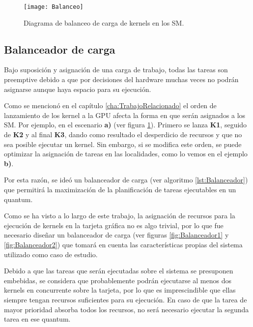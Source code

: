 

        \begin{figure}[!h]
      \centering
        \texttt{[image: Balanceo]}
        \caption{Diagrama de balanceo de carga de kernels en los SM.}
        \label{fig:Balanceo}
    \end{figure}
    

\subsection{Balanceador de carga} \label{secc:balanceador}

Bajo suposición y asignación de una carga de trabajo, todas las tareas son preemptive debido a que por decisiones del hardware muchas veces no podrán asignarse aunque haya espacio para su ejecución.

Como se mencionó en el capítulo \ref{cha:TrabajoRelacionado} el orden de lanzamiento de los kernel a la GPU afecta la forma en que serán asignados a los SM. Por ejemplo, en el escenario \textbf{a)} (ver figura \ref{fig:Balanceo}). Primero se lanza \textbf{K1}, seguido de \textbf{K2} y al final \textbf{K3}, dando como resultado el desperdicio de recursos y que no sea posible ejecutar un kernel. Sin embargo, si se modifica este orden, se puede optimizar la asignación de tareas en las localidades, como lo vemos en el ejemplo \textbf{b)}.

Por esta razón, se ideó un balanceador de carga (ver algoritmo \ref{lst:Balanceador}) que permitirá la maximización de la planificación de tareas ejecutables en un quantum.
\newline

    Como se ha visto a lo largo de este trabajo, la asignación de recursos para la ejecución de kernels en la tarjeta gráfica no es algo trivial, por lo que fue necesario diseñar un balanceador de carga (ver figuras \ref{fig:Balanceador1} y \ref{fig:Balanceador2}) que tomará en cuenta las características propias del sistema utilizado como caso de estudio.
    
    Debido a que las tareas que serán ejecutadas sobre el sistema se presuponen embebidas, se considera que probablemente podrán ejecutarse al menos dos kernels en concurrente sobre la tarjeta, por lo que es imprescindible que ellas siempre tengan recursos suficientes para su ejecución. En caso de que la tarea de mayor prioridad absorba todos los recursos, no será necesario ejecutar la segunda tarea en ese quantum.
\newline

